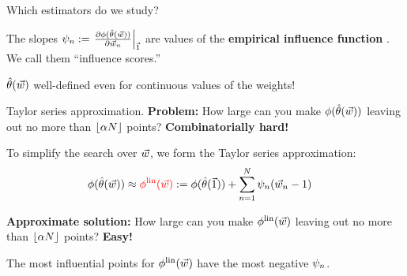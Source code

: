 \begin{frame}[t]{Which estimators do we study?}
\begin{minipage}{0.45\textwidth}
\begin{center}
\end{center}
\end{minipage}

The slopes $\psi_n := \left.\frac{\partial \phi(\hat{\theta}(\vec{w}))}{\partial \vec{w}_n}\right|_{\vec{1}}$ are values of the \textbf{empirical influence function}
\citep{hampel1986robustbook}.  We call them ``influence scores.''

\vspace{1em}
$\hat{\theta}(\vec{w})$ well-defined even for continuous values of the weights!

\end{frame}






\begin{frame}{Taylor series approximation.}
%
\textbf{Problem: } How large can you make $\phi(\hat{\theta}(\vec{w}))$
leaving out no more than $\lfloor \alpha N \rfloor$ points?  \textbf{Combinatorially hard!}

\vspace{1em}
To simplify the search over $\vec{w}$, we form the Taylor series approximation:
%
\begin{align*}
	\phi(\hat{\theta}(\vec{w}))
		&\approx
        \color{red}
        \phi^{\mathrm{lin}}(\vec{w})
        \color{black}
		:=  \phi(\hat{\theta}(\vec{1})) +
        \sum_{n=1}^N \psi_n (\vec{w}_n -1)
        \color{black}
\end{align*}
%

\vspace{1em}
\textbf{Approximate solution: } How large can you make $\phi^{\mathrm{lin}}(\vec{w})$
leaving out no more than $\lfloor \alpha N \rfloor$ points?  \textbf{Easy! }

\vspace{1em}
The most influential points for $\phi^{\mathrm{lin}}(\vec{w})$ have the
most negative $\psi_n$.

\end{frame}






